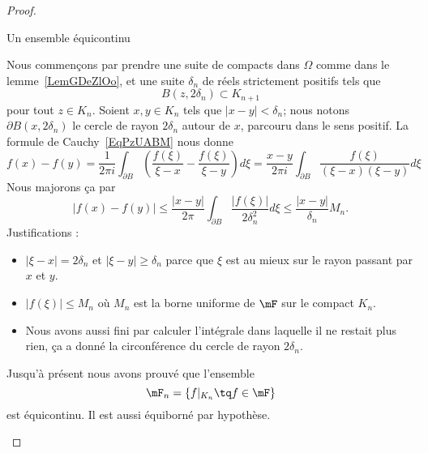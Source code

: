 \begin{proof}

    \begin{subproof}
    \item[Un ensemble équicontinu]

        Nous commençons par prendre une suite de compacts dans \( \Omega\) comme dans le lemme~\ref{LemGDeZlOo}, et une suite \( \delta_n\) de réels strictement positifs tels que
        \begin{equation}
            B(z,2\delta_n)\subset K_{n+1}
        \end{equation}
        pour tout \( z\in K_n\). Soient \( x,y\in K_n\) tels que \( | x-y |<\delta_n\); nous notons \( \partial B(x,2\delta_n)\) le cercle de rayon \( 2\delta_n\) autour de \( x\), parcouru dans le sens positif. La formule de Cauchy~\ref{EqPzUABM} nous donne
        \begin{equation}
                f(x)-f(y)=\frac{1}{ 2\pi i }\int_{\partial B}\left( \frac{ f(\xi) }{ \xi-x }-\frac{ f(\xi) }{ \xi-y } \right)d\xi
                =\frac{ x-y }{ 2\pi i }\int_{\partial B}\frac{ f(\xi) }{ (\xi-x)(\xi-y) }d\xi
        \end{equation}
        Nous majorons ça par
        \begin{equation}
            \big| f(x)-f(y) \big|\leq\frac{ | x-y | }{ 2\pi }\int_{\partial B}\frac{ | f(\xi) | }{ 2\delta_n^2 }d\xi\leq \frac{ | x-y | }{ \delta_n }M_n.
        \end{equation}
        Justifications :
        \begin{itemize}
            \item
                \( | \xi-x |=2\delta_n\) et \( | \xi-y |\geq \delta_n\) parce que \( \xi\) est au mieux sur le rayon passant par \( x\) et \( y\).
            \item
                \( | f(\xi) |\leq M_n\) où \( M_n\) est la borne uniforme de \( \mF\) sur le compact \( K_n\).
            \item
                Nous avons aussi fini par calculer l'intégrale dans laquelle il ne restait plus rien, ça a donné la circonférence du cercle de rayon \( 2\delta_n\).
        \end{itemize}
        Jusqu'à présent nous avons prouvé que l'ensemble
        \begin{equation}
            \mF_n=\{ f|_{K_n}\tq f\in\mF \}
        \end{equation}
        est équicontinu. Il est aussi équiborné par hypothèse.


\end{subproof}
\end{proof}
